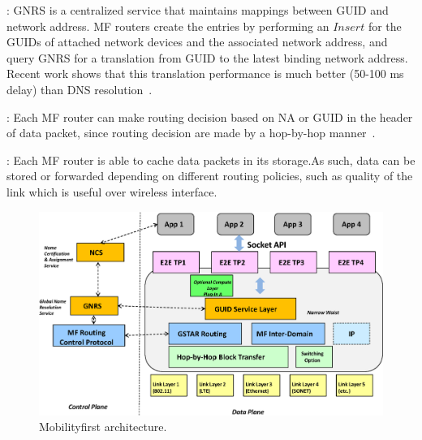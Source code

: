 : GNRS is a centralized service that maintains mappings between GUID and network address. MF routers create the entries by performing an $Insert$ for the GUIDs of attached network devices and the associated network address, and query GNRS for a translation from GUID to the latest binding network address. Recent work shows that this translation performance is much better (50-100 ms delay) than DNS resolution~\cite{vu2012dmap}.

: Each MF router can make routing decision based on NA or GUID in the header of data packet, since routing decision are made by a hop-by-hop manner~\cite{nelson2011gstar}.

: Each MF router is able to cache data packets in its storage.As such,  data can be stored or forwarded depending on different routing policies, such as quality of the link which is  useful over wireless interface.

\begin{figure}
\centering
\includegraphics[width=\columnwidth]{figure/mf_arch.eps}
\caption{\label{fig:mf_arch}Mobilityfirst architecture.}
\vspace{-1mm}
\end{figure}


